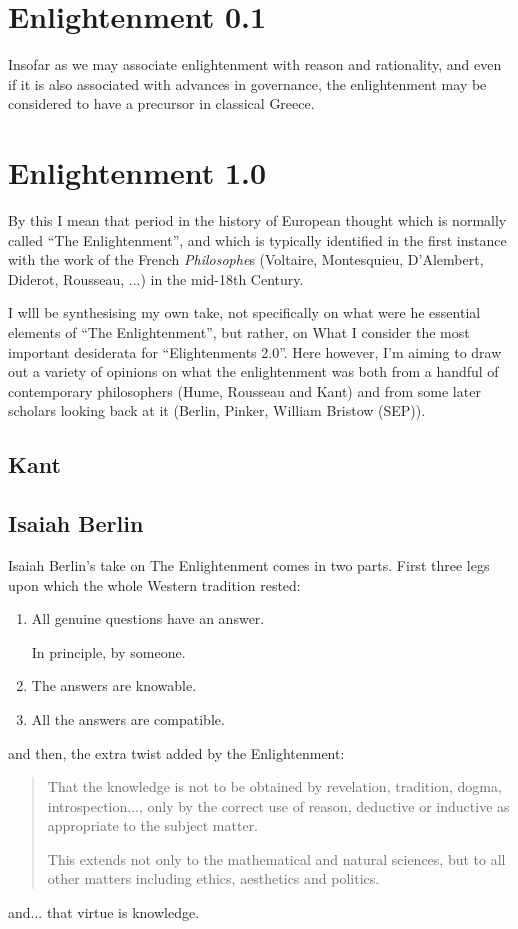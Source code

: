 \documentclass[10pt,titlepage]{article}
\begin{document}
\section{Enlightenment 0.1}

Insofar as we may associate enlightenment with reason and rationality, and even if it is also associated with advances in governance, the enlightenment may be considered to have a precursor in classical Greece.

\section{Enlightenment 1.0}

By this I mean that period in the history of European thought which is normally called ``The Enlightenment'', and which is typically identified in the first instance with the work of the French \emph{Philosophe}s (Voltaire, Montesquieu, D'Alembert, Diderot, Rousseau, ...) in the mid-18th Century.

I wlll be synthesising my own take, not specifically on what were he essential elements of ``The Enlightenment'', but rather, on What I consider the  most important desiderata for ``Elightenments 2.0''.
Here however, I'm aiming to draw out a variety of opinions on what the enlightenment was both from a handful of contemporary philosophers (Hume, Rousseau and Kant) and from some later scholars looking back at it (Berlin, Pinker, William Bristow (SEP)).

\subsection{Kant}

\subsection{Isaiah Berlin}

Isaiah Berlin's take on The Enlightenment comes in two parts.
First three legs upon which the whole Western tradition rested:
\begin{enumerate}
  \item All genuine questions have an answer.

    In principle, by someone.
\item  The answers are knowable.
\item All the answers are compatible.
\end{enumerate}

and then, the extra twist added by the Enlightenment:
\begin{quotation}
That the knowledge is not to be obtained by revelation, tradition, dogma, introspection..., only by the correct use of reason, deductive or inductive as appropriate to the subject matter.

This extends not only to the mathematical and natural sciences, but to all other matters including ethics, aesthetics and politics.
\end{quotation}
and... that virtue is knowledge.
\end{document}
